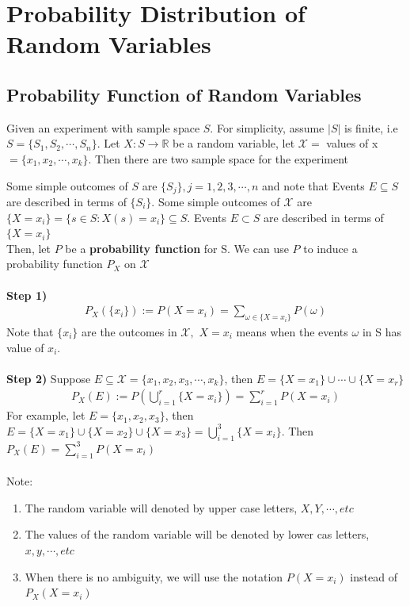 \documentclass[11pt,oneside]{book}
\theoremstyle{newStyle}
\newcommand{\R}{\mathbb{R}}
\newcommand{\X}{\mathcal{X}}
\newcommand{\note}{\color{red}Note: \color{black}}
\begin{document}
\section[Distribution of Random Variables]{Probability Distribution of Random Variables}
\subsection[Probability Function of Random Variables]{Probability Function of Random Variables}
Given an experiment with sample space $S$. For simplicity, assume $|S|$ is finite, i.e $S=\{S_1,S_2,\cdots,S_n\}$. Let $X:S\to \R$ be a random variable, let $\X=$ values of x $=\{x_1,x_2,\cdots,x_k\}$. Then there are two sample space for the experiment
\begin{center}
\end{center}
Some simple outcomes of $S$ are $\{S_j\},j=1,2,3,\cdots,n$ and note that Events $E\subseteq S$ are described in terms of $\{S_i\}$. Some simple outcomes of $\X$ are $\{X=x_i\}=\{s\in S:X(s)=x_i\}\subseteq S$. Events $E\subset S$ are described in terms of $\{X=x_i\}$\\
Then, let $P$ be a \textbf{probability function} for S. We can use $P$ to induce a probability function $P_X$ on $\X$\\
\hfill\\
\textbf{Step 1)} \begin{align*}
P_X(\{x_i\}):=P(X=x_i)=\sum_{\omega\in \{X=x_i\}}P(\omega)
\end{align*}
Note that $\{x_i\}$ are the outcomes in $\X,$ $X=x_i$ means when the events $\omega$ in S has value of $x_i$.\\
\hfill\\
\textbf{Step 2)} Suppose $E\subseteq \X =\{x_1,x_2,x_3,\cdots,x_k\}$, then $E=\{X=x_1\}\cup \cdots \cup \{X=x_r\}$ \begin{align*}
P_X(E):=P\left(\bigcup_{i=1}^{r}\{X=x_i\} \right)=\sum_{i=1}^{r}P(X=x_i)
\end{align*}
For example, let $E=\{x_1,x_2,x_3\}$, then $E=\{X=x_1\}\cup \{X=x_2\}\cup \{X=x_3\}=\bigcup_{i=1}^3\{X=x_i\}$. Then $P_X(E)=\sum_{i=1}^3P(X=x_i)$\\
\hfill\\
\note \begin{enumerate}[itemsep=0pt, topsep=1pt, partopsep=0pt]
\item The random variable will denoted by upper case letters, $X,Y,\cdots,etc$
\item The values of the random variable will be denoted by lower cas letters, $x,y,\cdots,etc$
\item When there is no ambiguity, we will use the notation $P(X=x_i)$ instead of $P_X(X=x_i)$
\end{enumerate}
\end{document}
